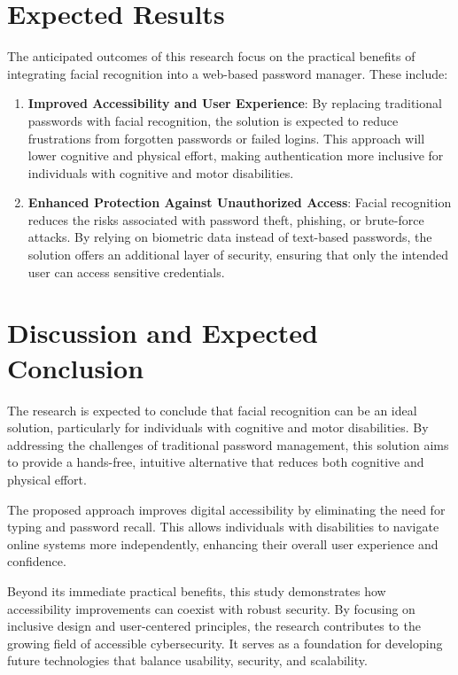 \clearpage
\section{Expected Results}%
\label{sec:expected-results}

The anticipated outcomes of this research focus on the practical benefits of integrating facial recognition into a web-based password manager. These include:

\begin{enumerate}
    \item \textbf{Improved Accessibility and User Experience}:  
    By replacing traditional passwords with facial recognition, the solution is expected to reduce frustrations from forgotten passwords or failed logins. This approach will lower cognitive and physical effort, making authentication more inclusive for individuals with cognitive and motor disabilities.

    \item \textbf{Enhanced Protection Against Unauthorized Access}:  
    Facial recognition reduces the risks associated with password theft, phishing, or brute-force attacks. By relying on biometric data instead of text-based passwords, the solution offers an additional layer of security, ensuring that only the intended user can access sensitive credentials.
\end{enumerate}


\section{Discussion and Expected Conclusion}%
\label{sec:discussion-conclusion}

The research is expected to conclude that facial recognition can be an ideal solution, particularly for individuals with cognitive and motor disabilities. By addressing the challenges of traditional password management, this solution aims to provide a hands-free, intuitive alternative that reduces both cognitive and physical effort.

The proposed approach improves digital accessibility by eliminating the need for typing and password recall. This allows individuals with disabilities to navigate online systems more independently, enhancing their overall user experience and confidence.

Beyond its immediate practical benefits, this study demonstrates how accessibility improvements can coexist with robust security. By focusing on inclusive design and user-centered principles, the research contributes to the growing field of accessible cybersecurity. It serves as a foundation for developing future technologies that balance usability, security, and scalability.

